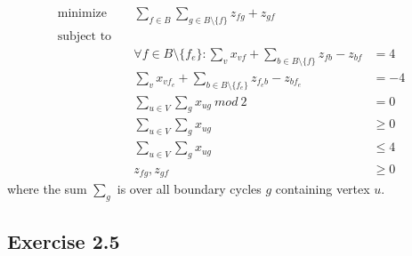 \begin{align*}
  \text{minimize} \quad & \sum_{f\in B} \sum_{g\in B\setminus\{f\}} z_{fg} + z_{gf} &  \\
  \text{subject to} \quad & & \\
  & \forall f \in B\setminus \{f_e\} : \sum_{v} x_{vf} + \sum_{b\in B\setminus \{f\}} z_{fb} - z_{bf} &= 4 \\
  & \sum_{v} x_{v f_e} + \sum_{b\in B\setminus \{f_e\}} z_{f_e b} - z_{b f_e} &= -4 \\
  & \sum_{u\in V} \sum_{g} x_{ug} \ \textit{mod} \ 2 & = 0 \\
  & \sum_{u\in V} \sum_{g} x_{ug} & \geq 0 \\
  & \sum_{u\in V} \sum_{g} x_{ug} & \leq 4 \\
  & z_{fg}, z_{gf} & \geq 0
\end{align*} 
%
where the sum $\sum_{g}$ is over all boundary cycles $g$ containing vertex $u$.
%
\subsection{Exercise 2.5}
